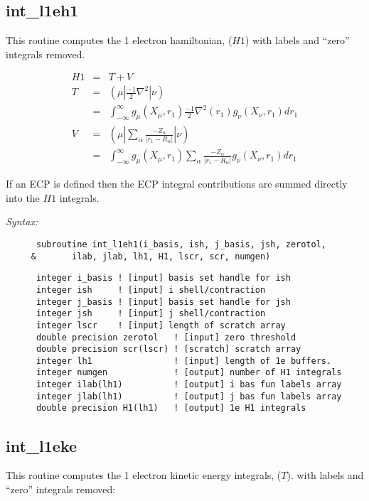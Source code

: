\subsection{int\_l1eh1} 
This routine computes the 1 electron hamiltonian, ($H1$) 
with labels and ``zero'' integrals removed.  
 
\begin{eqnarray*} 
H1 & = & T + V      \\ 
T  & = & ({\mu}|\frac{-1}{2}\nabla^{2}|{\nu}) \\ 
   & = & \int_{-\infty}^{\infty} g_{\mu}(X_{\mu},r_{1})\frac{-1}{2} 
\nabla^{2}(r_{1})g_{\nu}(X_{\nu},r_{1})dr_{1} \\ 
V  & = & ({\mu}|\sum_{\alpha}\frac{-Z_{\alpha}}{|r_{1}-R_{\alpha}|}|{\nu}) \\ 
   & = & \int_{-\infty}^{\infty} g_{\mu}(X_{\mu},r_{1})\sum_{\alpha}\frac 
{-Z_{\alpha}}{|r_{1}-R_{\alpha}|}g_{\nu}(X_{\nu},r_{1})dr_{1}  
\end{eqnarray*} 
 
If an ECP is defined then the ECP integral contributions are summed  
directly into the $H1$ integrals.   
 
{\it Syntax:} 
\begin{verbatim} 
      subroutine int_l1eh1(i_basis, ish, j_basis, jsh, zerotol, 
     &       ilab, jlab, lh1, H1, lscr, scr, numgen)  
\end{verbatim} 
\begin{verbatim} 
      integer i_basis ! [input] basis set handle for ish 
      integer ish     ! [input] i shell/contraction 
      integer j_basis ! [input] basis set handle for jsh 
      integer jsh     ! [input] j shell/contraction 
      integer lscr    ! [input] length of scratch array 
      double precision zerotol   ! [input] zero threshold  
      double precision scr(lscr) ! [scratch] scratch array 
      integer lh1                ! [input] length of 1e buffers. 
      integer numgen             ! [output] number of H1 integrals 
      integer ilab(lh1)          ! [output] i bas fun labels array 
      integer jlab(lh1)          ! [output] j bas fun labels array 
      double precision H1(lh1)   ! [output] 1e H1 integrals 
\end{verbatim} 
\subsection{int\_l1eke} 
This routine computes the 1 electron kinetic energy integrals, ($T$). 
with labels and ``zero'' integrals removed: 
 
